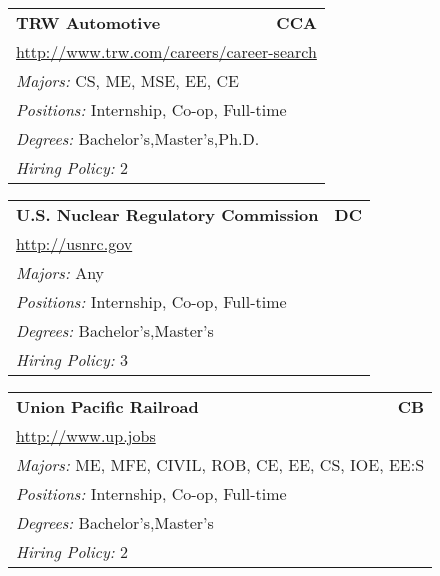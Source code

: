 \documentclass[twoside]{article}
\begin{document}
\begin{center}
\begin{multicols}{3}
\begin{FlushLeft}
\begin{minipage}{.9\columnwidth}
\end{minipage}
 
\begin{minipage}{.9\columnwidth}\begin{tabularx}{.95\columnwidth}{Xr}
                 {\Large\bf TRW Automotive} & {\Large\bf CCA}\\
    \multicolumn{2}{p{.95\columnwidth}}{\url{http://www.trw.com/careers/career-search}}\\
    \multicolumn{2}{p{.95\columnwidth}}{\emph{Majors:} CS, ME, MSE, EE, CE}\\
    \multicolumn{2}{p{.95\columnwidth}}{\emph{Positions:} Internship, Co-op, Full-time}\\
    \multicolumn{2}{p{.95\columnwidth}}{\emph{Degrees:} Bachelor's,Master's,Ph.D.}\\
    \multicolumn{2}{p{.95\columnwidth}}{\emph{Hiring Policy:} 2}\\
    \end{tabularx}
    
\end{minipage}
 
\begin{minipage}{.9\columnwidth}\begin{tabularx}{.95\columnwidth}{Xr}
                 {\Large\bf U.S. Nuclear Regulatory Commission} & {\Large\bf DC}\\
    \multicolumn{2}{p{.95\columnwidth}}{\url{http://usnrc.gov}}\\
    \multicolumn{2}{p{.95\columnwidth}}{\emph{Majors:} Any}\\
    \multicolumn{2}{p{.95\columnwidth}}{\emph{Positions:} Internship, Co-op, Full-time}\\
    \multicolumn{2}{p{.95\columnwidth}}{\emph{Degrees:} Bachelor's,Master's}\\
    \multicolumn{2}{p{.95\columnwidth}}{\emph{Hiring Policy:} 3}\\
    \end{tabularx}
    
\end{minipage}
 
\begin{minipage}{.9\columnwidth}\begin{tabularx}{.95\columnwidth}{Xr}
                 {\Large\bf Union Pacific Railroad} & {\Large\bf CB}\\
    \multicolumn{2}{p{.95\columnwidth}}{\url{http://www.up.jobs}}\\
    \multicolumn{2}{p{.95\columnwidth}}{\emph{Majors:} ME, MFE, CIVIL, ROB, CE, EE, CS, IOE, EE:S}\\
    \multicolumn{2}{p{.95\columnwidth}}{\emph{Positions:} Internship, Co-op, Full-time}\\
    \multicolumn{2}{p{.95\columnwidth}}{\emph{Degrees:} Bachelor's,Master's}\\
    \multicolumn{2}{p{.95\columnwidth}}{\emph{Hiring Policy:} 2}\\
    \end{tabularx}
    

\end{minipage}
\end{FlushLeft}
\end{multicols}
\end{center}
\end{document}
